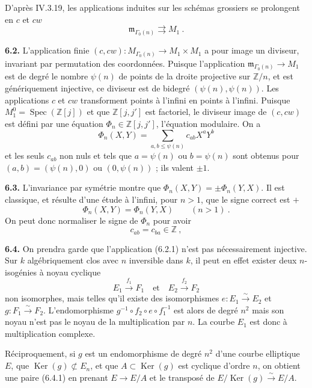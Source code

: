 \documentclass[10pt,a4paper]{amsart}
\theoremstyle{plain}
\theoremstyle{definition}
\DeclareMathOperator{\Spec}{Spec}
\DeclareMathOperator{\Ker}{Ker}
\newcommand{\m}{\mathfrak{m}}
\newcommand{\ZZ}{\mathbb{Z}}
\begin{document}
D'apr\`es IV.3.19, les applications induites sur les sch\'emas grossiers se prolongent en $c$ et $cw$
\[
\m_{\Gamma_0(n)} \rightrightarrows M_1\ .
\]

\medskip\noindent\textbf{6.2.} L'application finie $(c,cw) : M_{\Gamma_0(n)} \to M_1 \times M_1$ a pour image un diviseur, invariant par permutation des coordonn\'ees. Puisque l'application $\m_{\Gamma_0(n)} \to M_1$ est de degr\'e le nombre $\psi(n)$ de points de la droite projective sur $\ZZ/n$, et est g\'en\'eriquement injective, ce diviseur est de bidegr\'e $(\psi(n), \psi(n))$. Les applications $c$ et $cw$ transforment points \`a l'infini en points \`a l'infini. Puisque $M_1^0 = \Spec(\ZZ[j])$ et que $\ZZ[j, j']$ est factoriel, le diviseur image de $(c,cw)$ est d\'efini par une \'equation $\Phi_n \in \ZZ[j,j']$, l'\'equation modulaire. On a
\begin{equation}
\Phi_n(X,Y) = \sum_{a,b \leq \psi(n)} c_{ab} X^a Y^b
\end{equation}
et les seuls $c_{ab}$ non nuls et tels que $a = \psi(n)$ ou $b = \psi(n)$ sont obtenus pour $(a,b) = (\psi(n), 0)$ ou $(0, \psi(n))$ ; ils valent $\pm 1$.

\medskip\noindent\textbf{6.3.} L'invariance par sym\'etrie montre que $\Phi_n(X,Y) = \pm \Phi_n(Y,X)$. Il est classique, et r\'esulte d'une \'etude \`a l'infini, pour $n > 1$, que le signe correct est $+$
\begin{equation}
\Phi_n(X,Y) = \Phi_n(Y,X) \qquad (n > 1)\ .
\end{equation}
On peut donc normaliser le signe de $\Phi_n$ pour avoir
\begin{equation}
c_{ab} = c_{ba} \in \ZZ\ ,
\end{equation}

\medskip\noindent\textbf{6.4.} On prendra garde que l'application (6.2.1) n'est pas n\'ecessairement injective. Sur $k$ alg\'ebriquement clos avec $n$ inversible dans $k$, il peut en effet exister deux $n$-isog\'enies \`a noyau cyclique
\begin{equation}
E_1 \xrightarrow{f_1} F_1 \quad\text{et}\quad E_2 \xrightarrow{f_2} F_2
\end{equation}
non isomorphes, mais telles qu'il existe des isomorphismes $e : E_1 \xrightarrow{\sim} E_2$ et $g : F_1 \xrightarrow{\sim} F_2$. L'endomorphisme $g^{-1} \circ f_2 \circ e \circ f_1^{-1}$ est alors de degr\'e $n^2$ mais son noyau n'est pas le noyau de la multiplication par $n$. La courbe $E_1$ est donc \`a multiplication complexe.

R\'eciproquement, si $g$ est un endomorphisme de degr\'e $n^2$ d'une courbe elliptique $E$, que $\Ker(g) \not\subset E_n$, et que $A \subset \Ker(g)$ est cyclique d'ordre $n$, on obtient une paire (6.4.1) en prenant $E \to E/A$ et le transpos\'e de $E/\Ker(g) \xrightarrow{\sim} E/A$.
\end{document}
